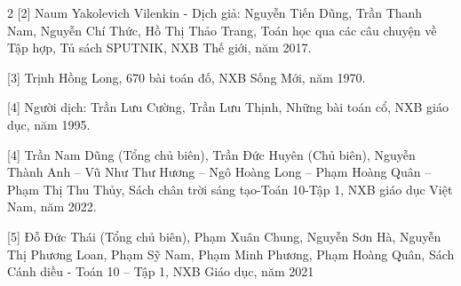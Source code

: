 \begin{multicols}{2}
	[2]	Naum Yakolevich Vilenkin - Dịch giả: Nguyễn Tiến Dũng, Trần Thanh Nam, Nguyễn Chí Thức, Hồ Thị Thảo Trang, Toán học qua các câu chuyện về Tập hợp, Tủ sách SPUTNIK, NXB Thế giới, năm 2017.
	
	[3]	Trịnh Hồng Long, 670 bài toán đố, NXB Sống Mới, năm 1970.
	
	[4]	Người dịch: Trần Lưu Cường, Trần Lưu Thịnh, Những bài toán cổ, NXB giáo dục, năm 1995.
	
	[4]	Trần Nam Dũng (Tổng chủ biên), Trần Đức Huyên (Chủ biên), Nguyễn Thành Anh – Vũ Như Thư Hương – Ngô Hoàng Long – Phạm Hoàng Quân – Phạm Thị Thu Thủy, Sách chân trời sáng tạo-Toán 10-Tập 1, NXB giáo dục Việt Nam, năm 2022.
	
	[5]	Đỗ Đức Thái (Tổng chủ biên), Phạm Xuân Chung, Nguyễn Sơn Hà, Nguyễn Thị Phương Loan, Phạm Sỹ Nam, Phạm Minh Phương, Phạm Hoàng Quân, Sách Cánh diều - Toán 10 – Tập 1, NXB Giáo dục, năm 2021
	
\end{multicols}